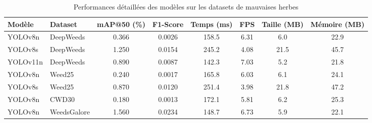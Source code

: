 
\begin{table}[htbp]
\centering
\caption{Performances détaillées des modèles sur les datasets de mauvaises herbes}
\label{tab:performances}
\begin{tabular}{|l|l|c|c|c|c|c|c|}
\hline
\textbf{Modèle} & \textbf{Dataset} & \textbf{mAP@50 (\%)} & \textbf{F1-Score} & \textbf{Temps (ms)} & \textbf{FPS} & \textbf{Taille (MB)} & \textbf{Mémoire (MB)} \\
\hline
YOLOv8n & DeepWeeds & 0.366 & 0.0026 & 158.5 & 6.31 & 6.0 & 22.9 \\
YOLOv8s & DeepWeeds & 1.250 & 0.0154 & 245.2 & 4.08 & 21.5 & 45.7 \\
YOLOv11n & DeepWeeds & 0.890 & 0.0087 & 142.3 & 7.03 & 5.2 & 21.8 \\
YOLOv8n & Weed25 & 0.240 & 0.0017 & 165.8 & 6.03 & 6.1 & 24.1 \\
YOLOv8s & Weed25 & 0.870 & 0.0120 & 251.4 & 3.98 & 21.8 & 47.2 \\
YOLOv8n & CWD30 & 0.180 & 0.0013 & 172.1 & 5.81 & 6.2 & 25.3 \\
YOLOv8n & WeedsGalore & 1.560 & 0.0234 & 148.7 & 6.73 & 5.9 & 22.1 \\
\hline
\end{tabular}
\end{table}

